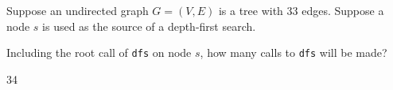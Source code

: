 \begin{prob}

    Suppose an undirected graph $G = (V, E)$ is a tree with 33 edges. Suppose a node $s$ is used as the source
    of a depth-first search.

    Including the root call of \texttt{dfs} on node $s$, how many calls to \texttt{dfs} will be made?

    \begin{soln}
        34
    \end{soln}

\end{prob}
